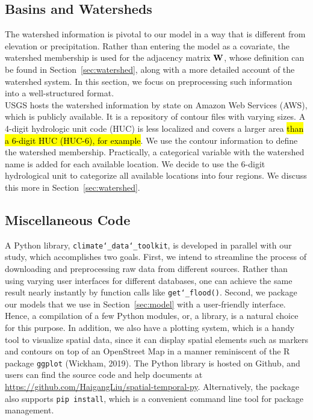 \subsection{Basins and Watersheds}
The watershed information is pivotal to our model in a way that is different from elevation or precipitation. Rather than entering the model as a covariate, the watershed membership is used for the adjacency matrix $\bold W$, whose definition can be found in Section~\ref{sec:watershed}, along with a more detailed account of the watershed system. In this section, we focus  on preprocessing such information into a well-structured format. \\

USGS hosts the watershed information by state on Amazon Web Services (AWS), which is publicly available. It is a repository of contour files with varying sizes. A 4-digit hydrologic unit code (HUC) is less localized and covers a larger area \hl{than a 6-digit HUC (HUC-6), for example}. We use the contour information to define the watershed membership. Practically, a categorical variable with the watershed name is added for each available location. We decide to use the 6-digit hydrological unit to categorize all available locations into four regions.  We discuss this more in Section~\ref{sec:watershed}.

\subsection{Miscellaneous Code}\label{subsec:code_intro}
A Python library, \texttt{climate\char`\_data\char`\_toolkit}, is developed in parallel with our study, which accomplishes two goals.
First, we intend to streamline the process of downloading and preprocessing  raw data from different sources.
Rather than using varying user interfaces for different databases, one can achieve the same result nearly instantly by function calls like \texttt{get\char`\_flood()}.
Second, we package our models that we use in Section~\ref{sec:model} with a user-friendly interface. Hence, a compilation of a few Python modules, or, a library, is a natural choice for this purpose. In addition, we also have a plotting system, which is a handy tool to visualize spatial data, since it can display spatial elements such as markers and contours on top of an OpenStreet Map in a manner reminiscent of the R package \texttt{ggplot} (Wickham, 2019). The Python library is hosted on Github, and users can find the source code and help documents at \url{https://github.com/HaigangLiu/spatial-temporal-py}. Alternatively, the package also supports \texttt{pip install}, which is a convenient command line tool for package management.
